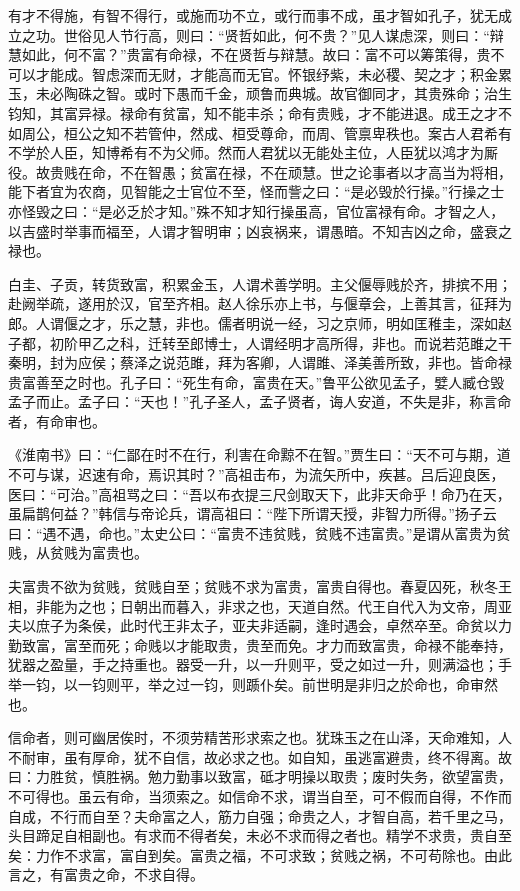\documentclass[]{article}
\begin{document}
有才不得施，有智不得行，或施而功不立，或行而事不成，虽才智如孔子，犹无成立之功。世俗见人节行高，则曰：``贤哲如此，何不贵？''见人谋虑深，则曰：``辩慧如此，何不富？''贵富有命禄，不在贤哲与辩慧。故曰：富不可以筹策得，贵不可以才能成。智虑深而无财，才能高而无官。怀银纾紫，未必稷、契之才；积金累玉，未必陶硃之智。或时下愚而千金，顽鲁而典城。故官御同才，其贵殊命；治生钧知，其富异禄。禄命有贫富，知不能丰杀；命有贵贱，才不能进退。成王之才不如周公，桓公之知不若管仲，然成、桓受尊命，而周、管禀卑秩也。案古人君希有不学於人臣，知博希有不为父师。然而人君犹以无能处主位，人臣犹以鸿才为厮役。故贵贱在命，不在智愚；贫富在禄，不在顽慧。世之论事者以才高当为将相，能下者宜为农商，见智能之士官位不至，怪而訾之曰：``是必毁於行操。''行操之士亦怪毁之曰：``是必乏於才知。''殊不知才知行操虽高，官位富禄有命。才智之人，以吉盛时举事而福至，人谓才智明审；凶哀祸来，谓愚暗。不知吉凶之命，盛衰之禄也。

白圭、子贡，转货致富，积累金玉，人谓术善学明。主父偃辱贱於齐，排摈不用；赴阙举疏，遂用於汉，官至齐相。赵人徐乐亦上书，与偃章会，上善其言，征拜为郎。人谓偃之才，乐之慧，非也。儒者明说一经，习之京师，明如匡稚圭，深如赵子都，初阶甲乙之科，迁转至郎博士，人谓经明才高所得，非也。而说若范雎之干秦明，封为应侯；蔡泽之说范雎，拜为客卿，人谓雎、泽美善所致，非也。皆命禄贵富善至之时也。孔子曰：``死生有命，富贵在天。''鲁平公欲见孟子，嬖人臧仓毁孟子而止。孟子曰：``天也！''孔子圣人，孟子贤者，诲人安道，不失是非，称言命者，有命审也。

《淮南书》曰：``仁鄙在时不在行，利害在命黥不在智。''贾生曰：``天不可与期，道不可与谋，迟速有命，焉识其时？''高祖击布，为流矢所中，疾甚。吕后迎良医，医曰：``可治。''高祖骂之曰：``吾以布衣提三尺剑取天下，此非天命乎！命乃在天，虽扁鹊何益？''韩信与帝论兵，谓高祖曰：``陛下所谓天授，非智力所得。''扬子云曰：``遇不遇，命也。''太史公曰：``富贵不违贫贱，贫贱不违富贵。''是谓从富贵为贫贱，从贫贱为富贵也。

夫富贵不欲为贫贱，贫贱自至；贫贱不求为富贵，富贵自得也。春夏囚死，秋冬王相，非能为之也；日朝出而暮入，非求之也，天道自然。代王自代入为文帝，周亚夫以庶子为条侯，此时代王非太子，亚夫非适嗣，逢时遇会，卓然卒至。命贫以力勤致富，富至而死；命贱以才能取贵，贵至而免。才力而致富贵，命禄不能奉持，犹器之盈量，手之持重也。器受一升，以一升则平，受之如过一升，则满溢也；手举一钧，以一钧则平，举之过一钧，则踬仆矣。前世明是非归之於命也，命审然也。

信命者，则可幽居俟时，不须劳精苦形求索之也。犹珠玉之在山泽，天命难知，人不耐审，虽有厚命，犹不自信，故必求之也。如自知，虽逃富避贵，终不得离。故曰：力胜贫，慎胜祸。勉力勤事以致富，砥才明操以取贵；废时失务，欲望富贵，不可得也。虽云有命，当须索之。如信命不求，谓当自至，可不假而自得，不作而自成，不行而自至？夫命富之人，筋力自强；命贵之人，才智自高，若千里之马，头目蹄足自相副也。有求而不得者矣，未必不求而得之者也。精学不求贵，贵自至矣：力作不求富，富自到矣。富贵之福，不可求致；贫贱之祸，不可苟除也。由此言之，有富贵之命，不求自得。
\end{document}
